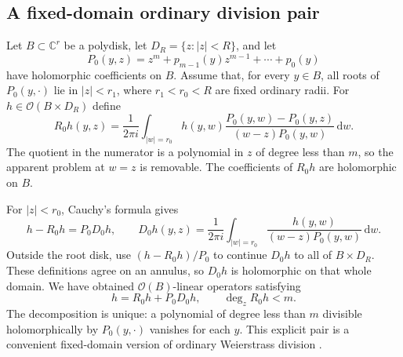 \documentclass[11pt,letterpaper]{article}
\theoremstyle{definition}
\theoremstyle{remark}
\newcommand{\C}{\mathbb C}
\newcommand{\OO}{\mathcal O}
\newcommand{\dd}{\mathrm d}
\begin{document}
\subsection{A fixed-domain ordinary division pair}
Let $B\subset\C^r$ be a polydisk, let $D_R=\{z:|z|<R\}$, and let
\[
 P_0(y,z)=z^m+p_{m-1}(y)z^{m-1}+\cdots+p_0(y)
\]
have holomorphic coefficients on $B$. Assume that, for every $y\in B$, all roots of $P_0(y,\cdot)$ lie in $|z|<r_1$, where $r_1<r_0<R$ are fixed ordinary radii. For $h\in\OO(B\times D_R)$ define
\begin{equation}\label{eq:ordinaryremainder}
 R_0h(y,z)=\frac{1}{2\pi i}\int_{|w|=r_0}
 h(y,w)\frac{P_0(y,w)-P_0(y,z)}{(w-z)P_0(y,w)}\,\dd w.
\end{equation}
The quotient in the numerator is a polynomial in $z$ of degree less than $m$, so the apparent problem at $w=z$ is removable. The coefficients of $R_0h$ are holomorphic on $B$.

For $|z|<r_0$, Cauchy's formula gives
\[
 h-R_0h=P_0D_0h,\qquad
 D_0h(y,z)=\frac{1}{2\pi i}\int_{|w|=r_0}
               \frac{h(y,w)}{(w-z)P_0(y,w)}\,\dd w.
\]
Outside the root disk, use $(h-R_0h)/P_0$ to continue $D_0h$ to all of $B\times D_R$. These definitions agree on an annulus, so $D_0h$ is holomorphic on that whole domain. We have obtained $\OO(B)$-linear operators satisfying
\begin{equation}\label{eq:ordinarydivision}
 h=R_0h+P_0D_0h,
 \qquad \deg_z R_0h<m.
\end{equation}
The decomposition is unique: a polynomial of degree less than $m$ divisible holomorphically by $P_0(y,\cdot)$ vanishes for each $y$. This explicit pair is a convenient fixed-domain version of ordinary Weierstrass division \cite{GunningRossi}.
\end{document}
